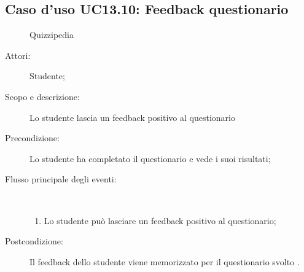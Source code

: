 \subsection{Caso d'uso UC13.10: Feedback questionario}
	\begin{figure}[H]
		\centering
		\begin{resizedtikzpicture}{\textwidth}
		\begin{umlsystem}[x=0, fill=lightgray!20]{Quizzipedia}
		\end{umlsystem}
		\end{resizedtikzpicture}
		\caption{}
	\end{figure}
\begin{description}
\item[Attori:] Studente;
\item[Scopo e descrizione:] Lo studente lascia un feedback positivo al questionario
      \item[Precondizione:] Lo studente ha completato il questionario e vede i suoi risultati;

        \item[Flusso principale degli eventi:] \ 
 \begin{enumerate}
          \item Lo studente può lasciare un feedback positivo al questionario;

      \end{enumerate}
    \item[Postcondizione:] Il feedback dello studente viene memorizzato per il questionario svolto .
  \end{description}
\hypertarget{UC13.11}{}
